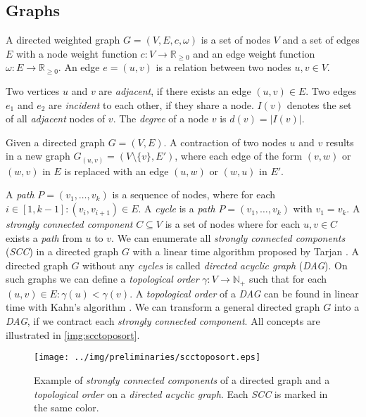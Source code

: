 \subsection{Graphs}

\begin{definition}
A directed weighted graph $G = (V,E,c,\omega)$ is a set of nodes $V$ 
and a set of edges $E$ with a node weight function 
$c: V \rightarrow \mathbb{R}_{\ge 0}$ and an edge weight 
function $\omega: E \rightarrow \mathbb{R}_{\ge 0}$. An edge $e = (u,v)$ 
is a relation between two nodes $u,v \in V$.
\label{def:hypergraph}
\end{definition}

Two vertices $u$ and $v$ are \emph{adjacent}, if there exists an edge
$(u,v) \in E$. Two edges $e_1$ and $e_2$ are \emph{incident} to each other, if they
share a node. $I(v)$ denotes the set of all \emph{adjacent} nodes of 
$v$. The \emph{degree} of a node $v$ is $d(v) = |I(v)|$.

\begin{definition}
Given a directed graph $G = (V,E)$. A contraction of two nodes
$u$ and $v$ results in a new graph $G_{(u,v)} = (V\setminus\{v\},E')$, where
each edge of the form $(v,w)$ or $(w,v)$ in $E$ is replaced with an edge 
$(u,w)$ or $(w,u)$ in $E'$.
\label{def:contraction}
\end{definition}

A \emph{path} $P = (v_1,\ldots,v_k)$ is a sequence of nodes, where for
each $i \in [1,k-1]: (v_i,v_{i+1}) \in E$. A \emph{cycle} is a \emph{path}
$P = (v_1,\ldots,v_k)$ with $v_1 = v_k$. A \emph{strongly connected 
component} $C \subseteq V$ is a set of nodes where for each $u,v \in C$
exists a \emph{path} from $u$ to $v$. We can enumerate all \emph{strongly
connected components} (\emph{SCC}) in a directed graph $G$ with a linear time algorithm
proposed by Tarjan \cite{tarjan1972depth}. A directed graph $G$ without
any \emph{cycles} is called \emph{directed acyclic graph} (\emph{DAG}). On such
graphs we can define a \emph{topological order} $\gamma: V \rightarrow \mathbb{N}_+$ such
that for each $(u,v) \in E: \gamma(u) < \gamma(v)$. A \emph{topological order}
of a \emph{DAG} can be found in linear time with Kahn's algorithm \cite{kahn1962topological}.
We can transform a general directed graph $G$ into a \emph{DAG}, if we contract
each \emph{strongly connected component}. All concepts are illustrated in 
\autoref{img:scctoposort}.

\begin{figure}[ht!]
\centering
\texttt{[image: ../img/preliminaries/scctoposort.eps]}
\caption{Example of \emph{strongly connected components} of a directed graph and
         a \emph{topological order} on a \emph{directed acyclic graph}. Each 
         \emph{SCC} is marked in the same color.} 
\label{img:scctoposort}
\end{figure}

